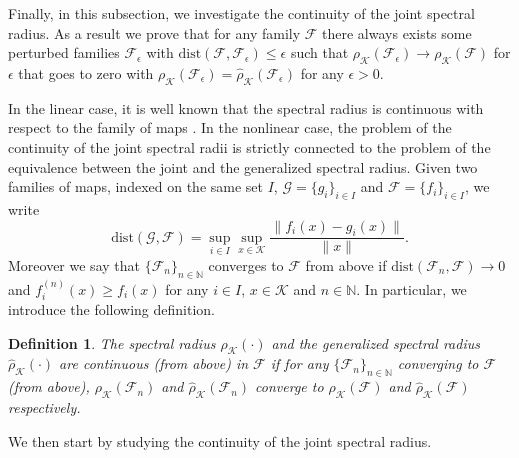 \documentclass{article}
\newtheorem{definition}[theorem]{Definition}
\newcommand{\N}{\mathbb{N}}
\newcommand{\family}{\mathcal{F}}
\newcommand{\cradius}{\rho_{\cone}}
\newcommand{\cgradius}{\widehat{\rho}_{\cone}}
\newcommand{\cone}{\mathcal{K}}
\begin{document}
Finally, in this subsection, we investigate the continuity of the joint spectral radius. As a result we prove that for any family $\family$ there always exists some perturbed families $\family_{\epsilon}$ with $\mathrm{dist}(\family,\family_\epsilon)\leq \epsilon$ such that $\cradius(\family_\epsilon)\rightarrow \cradius(\family)$ for $\epsilon$ that goes to zero with $\cradius(\family_\epsilon)=\cgradius(\family_\epsilon)$ for any $\epsilon>0$.

In the linear case, it is well known that the spectral radius is continuous with respect to the family of maps \cite{jungers2009joint,heil1995continuity,wirth2005generalized}. In the nonlinear case, the problem of the continuity of the joint spectral radii is strictly connected to the problem of the equivalence between the joint and the generalized spectral radius. 
Given two families of maps, indexed on the same set $I$, $\mathcal{G}=\{g_i\}_{i\in I}$ and $\mathcal{F}=\{f_i\}_{i\in I}$, we write 
\begin{equation}
    \mathrm{dist}(\mathcal{G},\mathcal{F})=\sup_{i\in I}\sup_{x\in \cone}\frac{\|f_i(x)-g_i(x)\|}{\|x\|}.    
\end{equation}
Moreover we say that $\{\family_n\}_{n\in \N}$ converges to $\family$ from above if $\mathrm{dist}(\family_n,\family
    )\rightarrow 0$ and $f_i^{(n)}(x)\geq f_i(x)$ for any $i\in I$, $x\in\cone$ and $n\in \N$. In particular, we introduce the following definition.

\begin{definition}\label{Definition_continuity_spectral_radius}
     The spectral radius $\cradius(\cdot)$ and the generalized spectral radius $\cgradius(\cdot)$ are continuous (from above) in $\family$ if for any $\{\family_n\}_{n\in \N}$ converging to $\family$ (from above),  $\cradius(\family_n)$ and $\cgradius(\family_n)$ converge to $\cradius(\family)$ and $\cgradius(\family)$ respectively.
\end{definition}

We then start by studying the continuity of the joint spectral radius.
\end{document}
